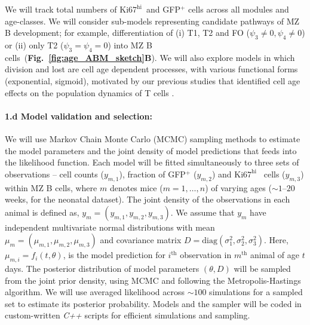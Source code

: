 \documentclass[11pt]{article}
\newcommand{\khi}{\ensuremath{\text{Ki67}^\text{hi}}~}
\newcommand{\para}[1]{\vspace*{-4.5mm}\paragraph{#1}}
\newcommand{\red}[1]{{\color{red}{#1}}}
\begin{document}
\vspace{1mm}
We will track total numbers of \khi and GFP$^+$ cells across all modules and age-classes. We will consider sub-models representing candidate pathways of MZ B development; for example, differentiation of (i) T1, T2 and FO ($\psi_{3}\neq0, \psi_{4}\neq0$) or (ii) only T2 ($\psi_{3} = \psi_{4} = 0$) into MZ B cells~(\textbf{Fig.~\ref{fig:age_ABM_sketch}B}). We will also explore models in which division and lost are cell age dependent processes, with various functional forms (exponential, sigmoid), motivated by our previous studies that identified cell age effects on the population dynamics of T cells \red{CITE}.

\para{{1.d Model validation and selection:}} \label{sec:stats-validation}

We will use  Markov Chain Monte Carlo (MCMC) sampling methods to estimate the model parameters and the joint density of model predictions that feeds into the likelihood function. %
Each model will be fitted simultaneously to three sets of observations -- cell counts ($y_{m,1}$), fraction of {GFP$^+$} ($y_{m,2}$) and {\khi} cells ($y_{m,3}$) within MZ B cells, where $m$ denotes mice ($m = 1,\ldots,n$) of varying ages ($\sim1\text{--}20$ weeks, for the neonatal dataset).
The joint density of the observations in each animal is defined as, $y_{m}=(y_{m,1}, y_{m,2}, y_{m,3})$.
We assume that $y_{m}$ have independent multivariate normal distributions with mean $\mu_{m}=(\mu_{m,1}, \mu_{m,2}, \mu_{m,3})$ and covariance matrix $D = \text{diag}(\sigma_{1}^{2}, \sigma_{2}^{2}, \sigma_{3}^{2})$.
Here, $\mu_{m, i} = f_{i}(t, \theta)$, is the model prediction for  $i^{\text{th}}$ observation in $m^{\text{th}}$ animal of age $t$ days.
The posterior distribution of model parameters $(\theta, D)$ will be sampled from the joint prior density, using MCMC and following the Metropolis-Hastings algorithm. %
We will use averaged likelihood across $\sim100$ simulations for a sampled set to estimate its posterior probability. 
Models and the sampler will be coded in custom-written \textit{C++} scripts for efficient simulations and sampling.
\end{document}
